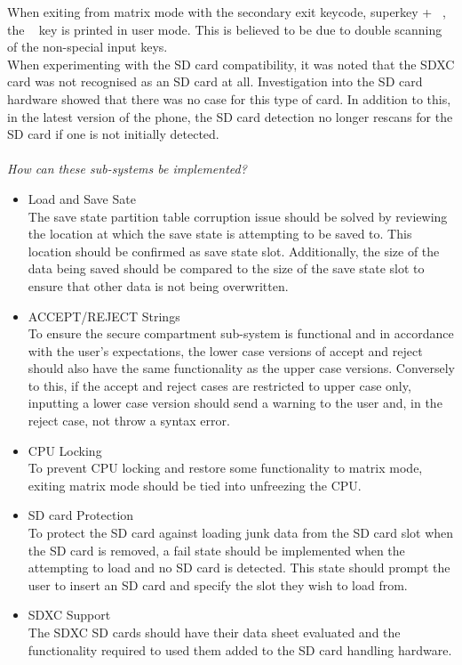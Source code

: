 When exiting from matrix mode with the secondary exit keycode, superkey + ~, the ~ key is printed in user mode. 
This is believed to be due to double scanning of the non-special input keys.\\
When experimenting with the SD card compatibility, it was noted that the SDXC card was not recognised as an SD card at all. Investigation into the SD card hardware showed that there was no case for this type of card. 
In addition to this, in the latest version of the phone, the SD card detection no longer rescans for the SD card if one is not initially detected.\\
\\
\textit{How can these sub-systems be implemented?}\\
\begin{itemize}
\item{Load and Save Sate}\\
  The save state partition table corruption issue should be solved by reviewing the location at which the save state is attempting to be saved to. 
  This location should be confirmed as save state slot. 
  Additionally, the size of the data being saved should be compared to the size of the save state slot to ensure that other data is not being overwritten.
\item{ACCEPT/REJECT Strings}\\
  To ensure the secure compartment sub-system is functional and in accordance with the user's expectations, the lower case versions of accept and reject should also have the same functionality as the upper case versions. 
  Conversely to this, if the accept and reject cases are restricted to upper case only, inputting a lower case version should send a warning to the user and, in the reject case, not throw a syntax error.
\item{CPU Locking}\\
  To prevent CPU locking and restore some functionality to matrix mode, exiting matrix mode should be tied into unfreezing the CPU.
\item{SD card Protection}\\
  To protect the SD card against loading junk data from the SD card slot when the SD card is removed, a fail state should be implemented when the attempting to load and no SD card is detected. This state should prompt the user to insert an SD card and specify the slot they wish to load from.
\item{SDXC Support}\\
  The SDXC SD cards should have their data sheet evaluated and the functionality required to used them added to the SD card handling hardware.
\end{itemize}

